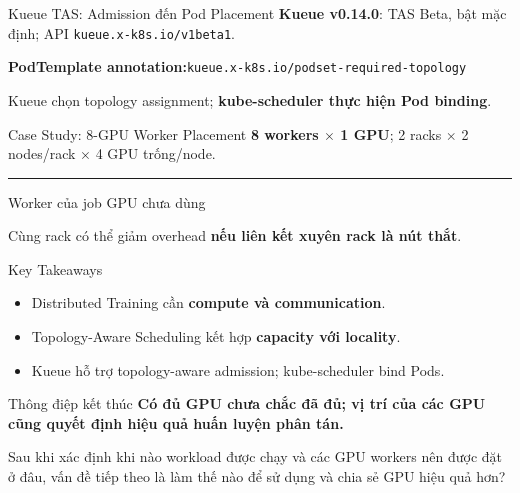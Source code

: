\begin{frame}{Kueue TAS: Admission đến Pod Placement}
 \small
 \textbf{Kueue v0.14.0}: TAS Beta, bật mặc định; API \texttt{kueue.x-k8s.io/v1beta1}.
 \begin{center}\end{center}
 \vspace{-.15cm}
 \textbf{PodTemplate annotation:}\quad\texttt{kueue.x-k8s.io/podset-required-topology}
 \par\vspace{.1cm}Kueue chọn topology assignment; \textbf{kube-scheduler thực hiện Pod binding}.
\end{frame}

\begin{frame}{Case Study: 8-GPU Worker Placement}
 \small
 \textbf{8 workers $\times$ 1 GPU}; 2 racks $\times$ 2 nodes/rack $\times$ 4 GPU trống/node.
 \par\vspace{.12cm}{\centering\par}\vspace{.08cm}
 \textcolor{BKTemplate}{\rule{.22cm}{.22cm}}\; Worker của job\qquad
 \fbox{\rule{0pt}{.14cm}\hspace{.14cm}}\; GPU chưa dùng
 \par\vspace{.02cm}
 Cùng rack có thể giảm overhead \textbf{nếu liên kết xuyên rack là nút thắt}.
\end{frame}

\begin{frame}{Key Takeaways}
 \small
 \begin{itemize}
  \setlength{\itemsep}{.18cm}
  \item Distributed Training cần \textbf{compute và communication}.
  \item Topology-Aware Scheduling kết hợp \textbf{capacity với locality}.
  \item Kueue hỗ trợ topology-aware admission; kube-scheduler bind Pods.
 \end{itemize}
 \begin{block}{Thông điệp kết thúc}
  \textbf{Có đủ GPU chưa chắc đã đủ; vị trí của các GPU cũng quyết định hiệu quả huấn luyện phân tán.}
 \end{block}
 \par\vspace{.18cm}
 Sau khi xác định khi nào workload được chạy và các GPU workers nên được đặt ở đâu,
 vấn đề tiếp theo là làm thế nào để sử dụng và chia sẻ GPU hiệu quả hơn?
\end{frame}
\endgroup
